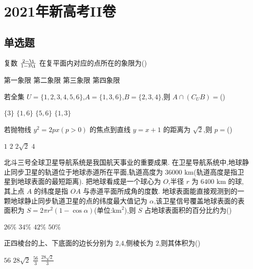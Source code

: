 
\chapter{2021年新高考II卷}

\section{单选题}

\begin{problem}
复数 \(\frac{2-\i}{1-3\i}\) 在复平面内对应的点所在的象限为(\quad)

\choices
    {第一象限}
    {第二象限}
    {第三象限}
    {第四象限}

\end{problem}


\begin{problem}
若全集 \(U=\{1,2,3,4,5,6\}\),\(A=\{1,3,6\}\),\(B=\{2,3,4\}\),则 \(A\cap \left( C_U B \right)=\)(\quad)

\choices
    {\(\{3\}\)}
    {\(\{1,6\}\)}
    {\(\{5,6\}\)}
    {\(\{1,3\}\)}

\end{problem}


\begin{problem}
若抛物线 \(y^2=2px\left( p>0 \right)\) 的焦点到直线 \(y=x+1\) 的距离为 \(\sqrt2\),则 \(p=\)(\quad)

\choices
    {\(1\)}
    {\(2\)}
    {\(2\sqrt2\)}
    {\(4\)}

\end{problem}


\begin{problem}
北斗三号全球卫星导航系统是我国航天事业的重要成果. 在卫星导航系统中,地球静止同步卫星的轨道位于地球赤道所在平面,轨道高度为 \(36000\text{ km}\)(轨道高度是指卫星到地球表面的最短距离). 把地球看成是一个球心为 \(O\),半径 \(r\) 为 \(6400\text{ km}\) 的球,其上点 \(A\) 的纬度是指 \(OA\) 与赤道平面所成角的度数. 地球表面能直接观测到的一颗地球静止同步轨道卫星的点的纬度最大值记为 \(\alpha\),该卫星信号覆盖地球表面的表面积为 \(S=2\pi r^2\left( 1-\cos \alpha \right)\)(单位:\(\text{km}^2\)),则 \(S\) 占地球表面积的百分比约为(\quad)

\choices
    {\(26\%\)}
    {\(34\%\)}
    {\(42\%\)}
    {\(50\%\)}

\end{problem}


\begin{problem}
正四棱台的上、下底面的边长分别为 \(2\),\(4\),侧棱长为 \(2\),则其体积为(\quad)

\choices
    {\(56\)}
    {\(28\sqrt2\)}
    {\(\frac{56}{3}\)}
    {\(\frac{28\sqrt2}{3}\)}

\end{problem}


